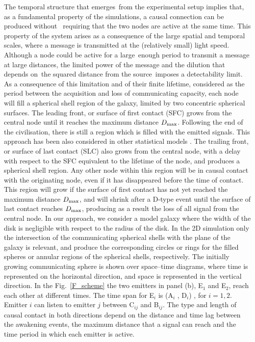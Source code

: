 \documentclass[crop]{CSLB}
\newcommand{\ceti}{node}
\begin{document}
The temporal structure that emerges from the experimental setup implies that,
as a fundamental property of the simulations, a causal connection can be
produced without  requiring that the two nodes are active at the same time.
%
This property of the system arises as a consequence of the large spatial and
temporal scales, where a message is transmitted at the (relatively small) light
speed.
%
Although a \ceti{} could be active for a large enough period to transmit a
message at large distances, the limited power of the message and the dilution
that depends on the squared distance from the source imposes a detectability
limit.
%
As a consequence of this limitation and of their finite lifetime, considered as
the period between the acquisition and loss of communicating capacity, each
\ceti{} will fill a spherical shell region of the galaxy, limited by two
concentric spherical surfaces.
%
The leading front, or surface of first contact (SFC) grows from the central
\ceti{} until it reaches the maximum distance $D_{\rm max}$.
%
Following the end of the civilisation, there is still a region which is filled
with the emitted signals.
%
This approach has been also considered in other statistical models \citep[e.g.,
][]{smith_broadcasting_2009, grimaldi_signal_2017, Grimaldi2018}.
%
The trailing front, or surface of last contact (SLC) also grows from the
central \ceti{}, with a delay with respect to the SFC equivalent to the
lifetime of the node, and produces a spherical shell region.
%
Any other \ceti{} within this region will be in causal contact with the originating node,
even if it has disappeared before the time of contact.
%
This region will grow if the surface of first contact has not yet reached the
maximum distance $D_{\rm max}$, and will shrink after a D-type event until the
surface of last contact reaches $D_{\rm max}$, producing as a result the loss
of all signal from the central \ceti{}.
%
In our approach, we consider a model galaxy where the width of the disk is
negligible with respect to the radius of the disk.
%
In the 2D simulation only the intersection of the communicating spherical
shells with the plane of the galaxy is relevant, and produce the corresponding
circles or rings for the filled spheres or annular regions of the spherical
shells, respectively.
%
The initially growing communicating sphere is shown over space--time diagrams,
where time is represented on the horizontal direction, and space is represented
in the vertical direction.
%
In the Fig.~\ref{F_scheme} the two emitters in panel (b), E$_1$ and E$_2$,
reach each other at different times.
%
The time span for E$_i$ is (A$_i$ , D$_i$) , for $i = {1, 2}$.
%
Emitter $i$ can listen to emitter $j$ between C$_{ij}$ and B$_{ij}$.
%
The type and length of causal contact in both directions depend on the distance
and time lag between the awakening events, the maximum distance that a signal
can reach and the time period in which each emitter is active.
\end{document}
